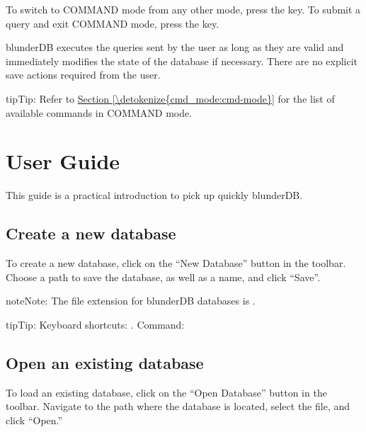 \documentclass[letterpaper,10pt,english]{sphinxmanual}
\begin{document}
\sphinxAtStartPar
To switch to COMMAND mode from any other mode, press the  key. To submit a query and exit COMMAND mode, press the  key.

\sphinxAtStartPar
blunderDB executes the queries sent by the user as long as they are valid and immediately modifies the state of the database if necessary. There are no explicit save actions required from the user.

\begin{sphinxadmonition}{tip}{Tip:}
\sphinxAtStartPar
Refer to \hyperref[\detokenize{cmd_mode:cmd-mode}]{Section \ref{\detokenize{cmd_mode:cmd-mode}}} for the list of available commands in COMMAND mode.
\end{sphinxadmonition}

\sphinxstepscope


\section{User Guide}
\label{\detokenize{guide_utilisateur:guide-utilisateur}}\label{\detokenize{guide_utilisateur:id1}}\label{\detokenize{guide_utilisateur::doc}}
\sphinxAtStartPar
This guide is a practical introduction to pick up quickly blunderDB.


\subsection{Create a new database}
\label{\detokenize{guide_utilisateur:creer-une-nouvelle-base-de-donnees}}
\sphinxAtStartPar
To create a new database, click on the “New Database” button in the toolbar. Choose a path to save the database, as well as a name, and click “Save”.

\begin{sphinxadmonition}{note}{Note:}
\sphinxAtStartPar
The file extension for blunderDB databases is .
\end{sphinxadmonition}

\begin{sphinxadmonition}{tip}{Tip:}
\sphinxAtStartPar
Keyboard shortcuts: . Command: 
\end{sphinxadmonition}


\subsection{Open an existing database}
\label{\detokenize{guide_utilisateur:ouvrir-une-base-de-donnee-existante}}
\sphinxAtStartPar
To load an existing database, click on the “Open Database” button in the toolbar. Navigate to the path where the database is located, select the  file, and click “Open.”
\end{document}
